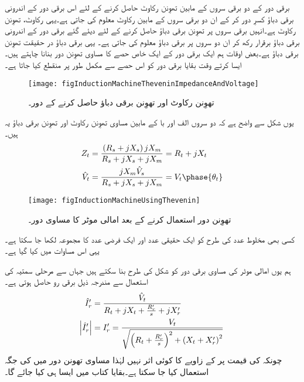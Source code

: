 برقی دور کے دو برقی سروں کے مابین تھوِنن رکاوٹ حاصل کرنے کے لئے  اس برقی دور کے اندرونی برقی دباؤ کسرِ دور کر کے ان دو برقی سروں کے مابین رکاوٹ معلوم کی جاتی ہے۔یہی رکاوٹ، تھوِنن رکاوٹ ہے۔انہیں برقی سروں پر تھوِنن برقی دباؤ حاصل کرنے کے لئے دیئے گئے برقی دور کے اندرونی برقی دباؤ برقرار رکھ کر ان دو سروں پر برقی دباؤ معلوم کی جاتی ہے۔ یہی برقی دباؤ در حقیقت تھوِنن برقی دباؤ ہے۔بعض اوقات ہم ایک برقی دور کے ایک خاص حصے کا مساوی تھوِنن دور بنانا چاہتے ہیں۔ایسا کرتے وقت بقایا برقی دور کو اس حصے سے مکمل طور پر منقطع کیا جاتا ہے۔
\begin{figure}
\centering
\texttt{[image: figInductionMachineTheveninImpedanceAndVoltage]}
\caption{تھوِنن رکاوٹ اور تھوِنن برقی دباؤ حاصل کرنے کے دور۔}
\label{شکل_امالی_تھونن_رکاوٹ_اور_دباؤ}
\end{figure}
یوں شکل   سے واضح ہے کہ دو سروں الف اور با کے مابین مساوی تھوِنن  رکاوٹ اور تھوِنن برقی دباؤ یہ ہیں۔
\begin{gather}
\begin{aligned}\label{مساوات_امالی_تھونن_متغرات}
Z_t&=\frac{\left(R_s+j X_s \right) j X_m}{R_s +j X_s + j X_m}=R_t+j X_t\\
\hat{V}_t&=\frac{j X_m \hat{V}_s}{R_s +j X_s + j X_m}=V_t \phase{\theta_t}
\end{aligned}
\end{gather}
%
\begin{figure}
\centering
\texttt{[image: figInductionMachineUsingThevenin]}
\caption{تھوِنن دور استعمال کرنے کے بعد امالی موٹر کا مساوی دور۔}
\label{شکل_امالی_تھونن_استعمال_کرتے_ہوئے}
\end{figure}
کسی بھی مخلوط عدد کی طرح   کو ایک حقیقی عدد  اور ایک فرضی عدد  کا مجموعہ لکھا جا سکتا ہے۔ یہی اس مساوات میں کیا گیا ہے۔

ہم یوں امالی موٹر کی مساوی برقی دور کو شکل   کی طرح بنا سکتے ہیں جہاں سے مرحلی سمتیہ کی استعمال سے مندرجہ ذیل برقی رو  حاصل ہوتی ہے۔
\begin{gather}
\begin{aligned}\label{مساوات_امالی_گھمتا_رو}
\hat{I}_r'&=\frac{\hat{V}_t}{R_t +  j X_t +\frac{R_r'}{s}+ j X_r'}\\
\abs{\hat{I}_r'}&=I_r'=\frac{V_t}{\sqrt{\left(R_t+\frac{R_r'}{s} \right)^2+\left(X_t+X_r' \right)^2}}
\end{aligned}
\end{gather}
چونکہ  کی قیمت پر  کے زاویے کا کوئی اثر نہیں لہٰذا مساوی تھونن دور میں  کی جگہ   استعمال کیا جا سکتا ہے۔بقایا کتاب میں ایسا ہی کیا جائے گا۔ 

